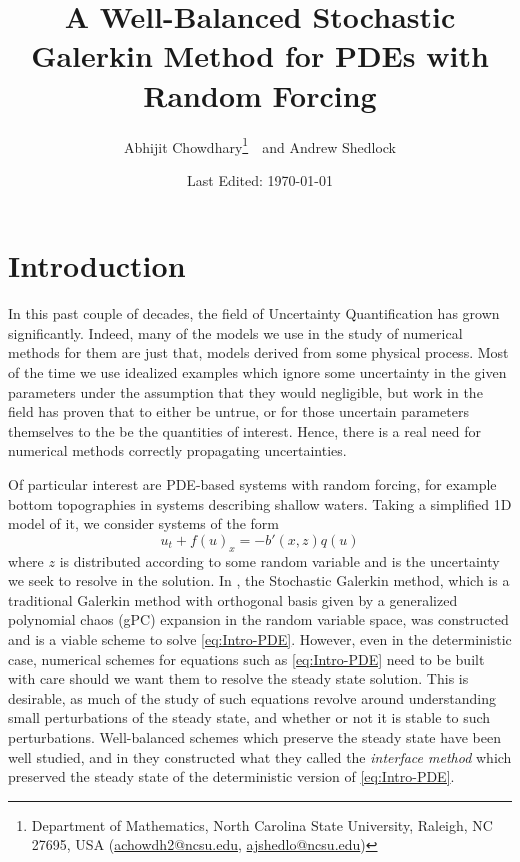 \documentclass[12pt]{article}
\begin{document}
\title{
  A Well-Balanced Stochastic Galerkin Method for PDEs with Random Forcing
}
\author{%
  Abhijit Chowdhary\footnote{%
    Department of Mathematics, North Carolina State University, Raleigh, NC
    27695, USA (\url{achowdh2@ncsu.edu}, \url{ajshedlo@ncsu.edu})
  }\ \ 
  and Andrew Shedlock\footnotemark[1]
}
\date{Last Edited: \today}
\maketitle

\section{Introduction}
In this past couple of decades, the field of Uncertainty Quantification has grown significantly.
Indeed, many of the models we use in the study of numerical methods for them are just that, models derived from some physical process.
Most of the time we use idealized examples which ignore some uncertainty in the given parameters under the assumption that they would negligible, but work in the field has proven that to either be untrue, or for those uncertain parameters themselves to the be the quantities of interest.
Hence, there is a real need for numerical methods correctly propagating uncertainties.

Of particular interest are PDE-based systems with random forcing, for example bottom topographies in systems describing shallow waters. Taking a simplified 1D model of it, we consider systems of the form
\begin{equation}
    \label{eq:Intro-PDE}
    u_t + f(u)_x = -b'(x,z) q(u)
\end{equation}
where $z$ is distributed according to some random variable and is the uncertainty we seek to resolve in the solution.
In \cite{Xiu2002, Xiu2010}, the Stochastic Galerkin method, which is a traditional Galerkin method with orthogonal basis given by a generalized polynomial chaos (gPC) expansion in the random variable space, was constructed and is a viable scheme to solve \eqref{eq:Intro-PDE}.
However, even in the deterministic case, numerical schemes for equations such as \eqref{eq:Intro-PDE} need to be built with care should we want them to resolve the steady state solution.
This is desirable, as much of the study of such equations revolve around understanding small perturbations of the steady state, and whether or not it is stable to such perturbations.
Well-balanced schemes which preserve the steady state have been well studied, and in \cite{Jin2001} they constructed what they called the \textit{interface method} which preserved the steady state of the deterministic version of \eqref{eq:Intro-PDE}.
\end{document}
